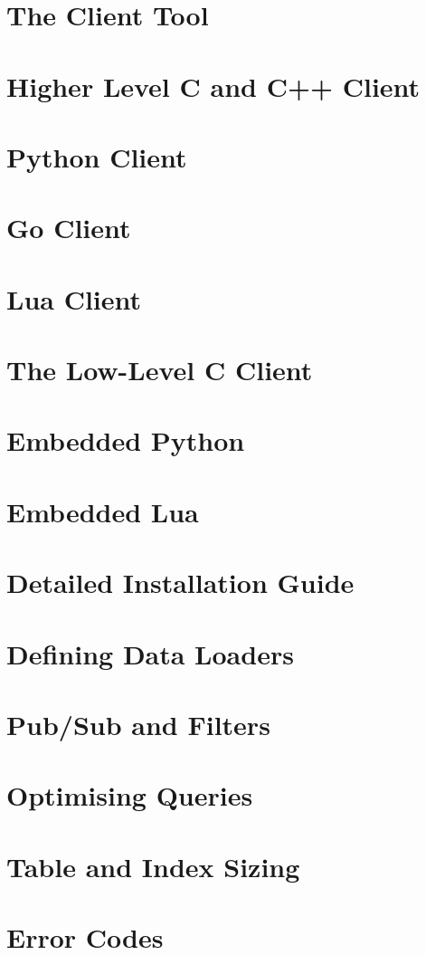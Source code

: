 \documentclass{scrreprt}
\begin{document}
\chapter{The Client Tool}\label{chpt_clienttool}

\chapter{Higher Level C and C++ Client}\label{chpt_ccpp}

\chapter{Python Client}\label{chpt_pythonclient}


\chapter{Go Client}\label{chpt_goclient}

\chapter{Lua Client}\label{chpt_luaclient}

\chapter{The Low-Level C Client}\label{chpt_llc}


\chapter{Embedded Python}\label{chpt_pythonemb}


\chapter{Embedded Lua}\label{chpt_luaemb}

\chapter{Detailed Installation Guide}\label{chpt_install}

\chapter{Defining Data Loaders}\label{chpt_loader}

\chapter{Pub/Sub and Filters}\label{chpt_pubsub}

\chapter{Optimising Queries}\label{chpt_opt}


\chapter{Table and Index Sizing}\label{chpt_sizing}

\chapter{Error Codes}\label{chpt_errors}

\end{document}

